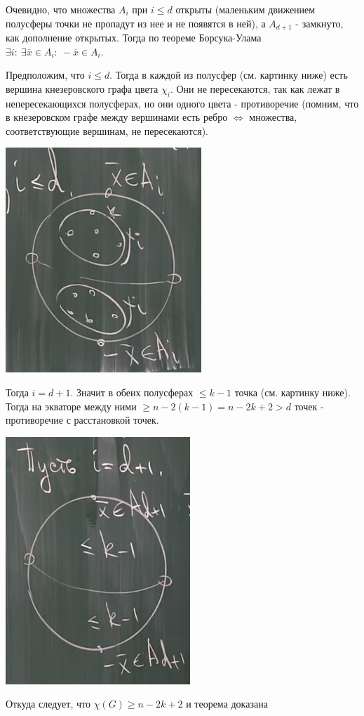\par Очевидно, что множества $A_i$ при $i \leq d$ открыты (маленьким движением полусферы точки не пропадут из нее и не появятся в ней), а $A_{d+1}$ - замкнуто, как дополнение открытых. Тогда по теореме Борсука-Улама $\exists i: \: \exists \overline{x} \in A_i: \: -\overline{x} \in A_i$.

\newpage{}
\par Предположим, что $i\leq d$. Тогда в каждой из полусфер (см. картинку ниже) есть вершина кнезеровского графа цвета $\chi_i$. Они не пересекаются, так как лежат в непересекающихся полусферах, но они одного цвета - противоречие (помним, что в кнезеровском графе между вершинами есть ребро $\Leftrightarrow$ множества, соответствующие вершинам, не пересекаются). 
\\
\begin{center}
    \includegraphics[scale=0.5]{images/dima_d.png}
\end{center}

\par Тогда $i=d+1$. Значит в обеих полусферах $\leq k-1$ точка (см. картинку ниже). Тогда на экваторе между ними $\geq n - 2(k-1)=n-2k+2>d$ точек - противоречие с расстановкой точек.
\\
\begin{center}
    \includegraphics[scale=0.5]{images/dima_d+1.png}
\end{center}

\par Откуда следует, что $\chi(G) \geq n-2k+2$ и теорема доказана \EndProof